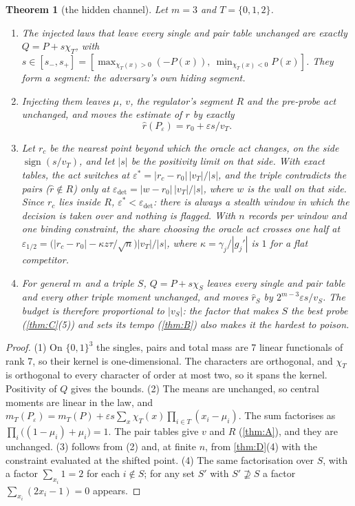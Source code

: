 \documentclass[11pt]{article}
\newtheorem{theorem}{Theorem}\renewcommand{\thetheorem}{\Alph{theorem}}
\theoremstyle{definition}\newtheorem{definition}{Definition}\newtheorem{remark}{Remark}
\begin{document}
\begin{theorem}[the hidden channel]\label{thm:F}
Let $m=3$ and $T=\{0,1,2\}$.
\begin{enumerate}
\item[(1)] The injected laws that leave every single and pair table unchanged are exactly $Q=P+s\chi_T$, with
$s\in[s_-,s_+]=[\max_{\chi_T(x)>0}(-P(x)),\ \min_{\chi_T(x)<0}P(x)]$. They form a segment: the adversary's own hiding segment.
\item[(2)] Injecting them leaves $\mu$, $v$, the regulator's segment $R$ and the pre-probe act unchanged, and moves the estimate of $r$
by exactly
\[
\hat r(P_\varepsilon)=r_0+\varepsilon s/v_T .
\]
\item[(3)] Let $r_c$ be the nearest point beyond which the oracle act changes, on the side $\operatorname{sign}(s/v_T)$, and let $|s|$ be
the positivity limit on that side. With exact tables, the act switches at $\varepsilon^*=|r_c-r_0|\,|v_T|/|s|$, and the triple
contradicts the pairs ($\hat r\notin R$) only at $\varepsilon_{\det}=|w-r_0|\,|v_T|/|s|$, where $w$ is the wall on that side. Since $r_c$
lies inside $R$, $\varepsilon^*<\varepsilon_{\det}$: there is always a \emph{stealth window} in which the decision is taken over and
nothing is flagged. With $n$ records per window and one binding constraint, the share choosing the oracle act crosses one half at
$\varepsilon_{1/2}=\bigl(|r_c-r_0|-\kappa z\tau/\sqrt n\bigr)|v_T|/|s|$, where $\kappa=\gamma_j/|g_j'|$ is $1$ for a flat competitor.
\item[(4)] For general $m$ and a triple $S$, $Q=P+s\chi_S$ leaves every single and pair table and every other triple moment unchanged,
and moves $\hat r_S$ by $2^{m-3}\varepsilon s/v_S$. The budget is therefore proportional to $|v_S|$: the factor that makes $S$ the best
probe (\cref{thm:C}(5)) and sets its tempo (\cref{thm:B}) also makes it the hardest to poison.
\end{enumerate}
\end{theorem}

\begin{proof}
(1) On $\{0,1\}^3$ the singles, pairs and total mass are 7 linear functionals of rank 7, so their kernel is one-dimensional. The
characters are orthogonal, and $\chi_T$ is orthogonal to every character of order at most two, so it spans the kernel. Positivity of
$Q$ gives the bounds. (2) The means are unchanged, so central moments are linear in the law, and
$m_T(P_\varepsilon)=m_T(P)+\varepsilon s\sum_x\chi_T(x)\prod_{i\in T}(x_i-\mu_i)$. The sum factorises as
$\prod_{i}\bigl((1-\mu_i)+\mu_i\bigr)=1$. The pair tables give $v$ and $R$ (\cref{thm:A}), and they are unchanged. (3) follows from (2)
and, at finite $n$, from \cref{thm:D}(4) with the constraint evaluated at the shifted point. (4) The same factorisation over $S$, with a
factor $\sum_{x_i}1=2$ for each $i\notin S$; for any set $S'$ with $S'\not\supseteq S$ a factor $\sum_{x_i}(2x_i-1)=0$ appears.
\end{proof}
\end{document}

